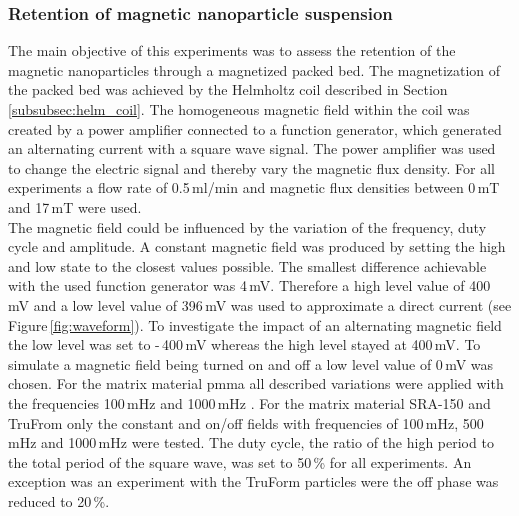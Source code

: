 \subsubsection{Retention of magnetic nanoparticle suspension}
\label{subsubsec:Ret_nanopart_method}
The main objective of this experiments was to assess the retention of the magnetic nanoparticles through a magnetized packed bed. The magnetization of the packed bed was achieved by the Helmholtz coil described in Section\,\ref{subsubsec:helm_coil}. The homogeneous magnetic field within the coil was created by a power amplifier connected to a function generator, which generated an alternating current with a square wave signal. The power amplifier was used to change the electric signal and thereby vary the magnetic flux density. For all experiments a flow rate of 0.5\,ml/min and magnetic flux densities between 0\,mT and 17\,mT were used. \\
The magnetic field could be influenced by the variation of the frequency, duty cycle and amplitude. A constant magnetic field was produced by setting the high and low state to the closest values possible. The smallest difference achievable with the used function generator was 4\,mV. Therefore a high level value of 400\,mV and a low level value of 396\,mV was used to approximate a direct current (see Figure\,\ref{fig:waveform}). To investigate the impact of an alternating magnetic field the low level was set to -\,400\,mV whereas the high level stayed at 400\,mV. To simulate a magnetic field being turned on and off a low level value of 0\,mV was chosen. For the matrix material \gls{pmma} all described variations were applied with the frequencies 100\,mHz and 1000\,mHz . For the matrix material SRA-150 and TruFrom only the constant and on/off fields with frequencies of 100\,mHz, 500\,mHz and 1000\,mHz were tested. The duty cycle, the ratio of the high period to the total period of the square wave, was set to 50\,\% for all experiments. An exception was an experiment with the TruForm particles were the off phase was reduced to 20\,\%.

